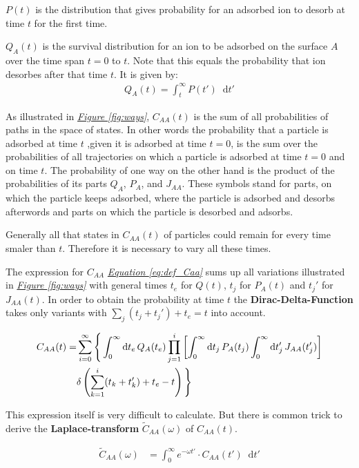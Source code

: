\documentclass[a4paper, parskip=half]{scrartcl}
\newcommand{\effect}[1]{%
	\textbf{#1}%
}
\newcommand{\diff}{\mathop{}\!\mathrm{d}}
\newcommand{\myFigRef}[1]{\textit{\hyperref[#1]{Figure \ref*{#1}}}}
\newcommand{\myEqRef}[1]{\textit{\hyperref[eq:#1]{Equation \ref*{eq:#1}}}}
\newcommand{\myEqLabel}[1]{\label{eq:#1}}
\begin{document}
$P(t)$ is the distribution that gives probability for an adsorbed ion to desorb at time $t$ for the first time.

$Q_A(t)$ is the survival distribution for an ion to be adsorbed on the surface $A$ over the time span $t=0$ to $t$. Note that this equals the probability that ion desorbes after that time $t$. It is given by:
\begin{align}
Q_A(t) = \int_t^\infty P(t') \diff t'
\end{align}

As illustrated in \myFigRef{fig:ways}, $C_{AA}(t)$ is the sum of all probabilities of paths in the space of states. In other words the probability that a particle is adsorbed at time $t$ ,given it is adsorbed at time $t=0$, is the sum over the probabilities of all trajectories on which a particle is adsorbed at time $t=0$ and on time $t$. The probability of one way on the other hand is the product of the probabilities of its parts $Q_A$, $P_A$, and $J_{AA}$. These symbols stand for parts, on which the particle keeps adsorbed, where the particle is adsorbed and desorbs afterwords and parts on which the particle is desorbed and adsorbs. 

Generally all that states in $C_{AA}(t)$ of particles could remain for every time smaler than $t$. Therefore it is necessary to vary all these times. 

The expression for $C_{AA}$ \myEqRef{def_Caa}  sums up all variations illustrated in \myFigRef{fig:ways} with general times $t_e$ for $Q(t)$, $t_j$ for $P_A(t)$ and $t_j'$ for $J_{AA}(t)$. In order to obtain the probability at time $t$ the \effect{Dirac-Delta-Function} takes only variants with $\sum_{j} (t_j+t_j') + t_e = t$ into account.

\begin{align}
C_{AA}(t) = &\sum_{i=0}^\infty \Bigg\lbrace \int_0^\infty \diff t_e\, Q_A(t_e) \prod_{j=1}^i \left[ \int_0^\infty \diff t_j\, P_A(t_j) \int_0^\infty \diff t_j'\, J_{AA}(t_j')\right]\notag\\ 
&\delta \left(\sum_{k=1}^i(t_k+t_k') + t_e - t \right) \Bigg\rbrace \myEqLabel{def_Caa}
\end{align}

This expression itself is very difficult to calculate. But there is common trick to derive the \effect{Laplace-transform} $\widetilde{C}_{AA}(\omega)$ of $C_{AA}(t)$.

\begin{align}
\widetilde{C}_{AA}(\omega) &= \int_0^\infty e^{-\omega t'} \cdot C_{AA}(t') \diff t'
\end{align}
\end{document}
